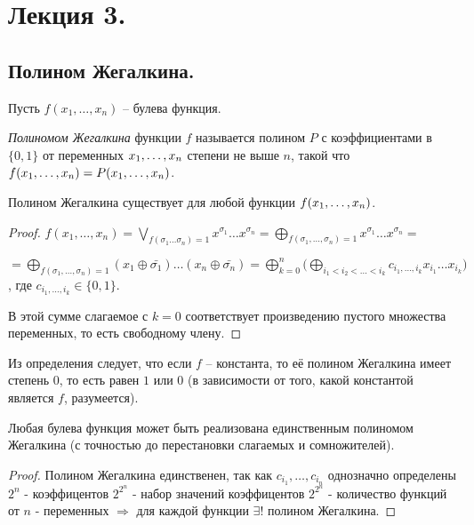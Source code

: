 
\section{Лекция 3.}
\subsection{Полином Жегалкина.} 
Пусть $f(x_1, \ldots, x_n)$ -- булева функция. %
\begin{definition} \textit{Полиномом Жегалкина} функции $f$ называется полином $P$ с коэффициентами в $\{0,1\}$ от переменных $x_1, \ldots, x_n$ степени не выше $n$, такой что $f(x_1, \ldots, x_n) = P(x_1, \ldots, x_n)$. \end{definition}
\begin{statement}
    Полином Жегалкина существует для любой функции $f(x_1, \ldots, x_n)$.
\end{statement}
\begin{proof}
$f(x_1, \ldots, x_n)=\bigvee \limits_{f(\sigma_1 \ldots \sigma_n)=1} x^{\sigma_1} \ldots x^{\sigma_n}=\bigoplus \limits_{f(\sigma_1, \ldots, \sigma_n)=1} x^{\sigma_1} \ldots x^{\sigma_n}=$ 
\begin{flushright}
$
=\bigoplus \limits_{f(\sigma_1, \ldots, \sigma_n)=1} (x_1\oplus \bar{\sigma_1})\ldots(x_n\oplus \bar{\sigma_n})=\bigoplus \limits^n_{k=0} \big( \bigoplus \limits_{i_1<i_2< \ldots<i_k} c_{i_1, \ldots, i_k}x_{i_1} \ldots x_{i_k}\big) $, где  $c_{i_1, \ldots, i_k} \in \{0,1\}$.
\end{flushright} 
В этой сумме слагаемое с $k=0$ соответствует произведению пустого множества переменных, то есть свободному члену.
\end{proof}

Из определения следует, что если $f$ -- константа, то её полином Жегалкина имеет степень $0$, то есть равен $1$ или $0$ (в зависимости от того, какой константой является $f$, разумеется). 
\begin{statement}
	Любая булева функция может быть реализована единственным полиномом Жегалкина (с точностью до перестановки слагаемых и сомножителей). 
\end{statement}
\begin{proof}
	Полином Жегалкина единственен, так как $c_{i_1}, \ldots, c_{i_n}$ однозначно определены $2^n$ -  коэффицентов $2^{2^n}$ - набор значений коэффицентов $2^{2^n}$ - количество функций от $n$ - переменных $\Rightarrow$ для каждой функции $\exists !$ полином Жегалкина. 
\end{proof}
